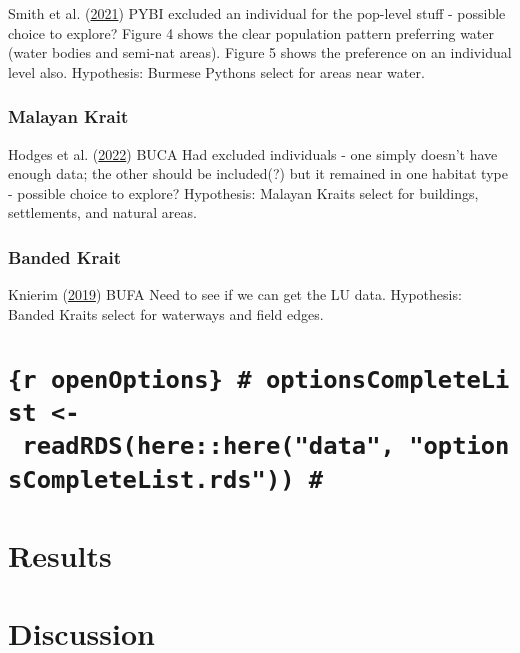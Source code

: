 \documentclass[10pt,a4paper]{article}
\begin{document}
Smith et al. (\protect\hyperlink{ref-smith_native_2021}{2021})
PYBI
excluded an individual for the pop-level stuff - possible choice to explore?
Figure 4 shows the clear population pattern preferring water (water bodies and semi-nat areas). Figure 5 shows the preference on an individual level also.
Hypothesis: Burmese Pythons select for areas near water.

\hypertarget{malayan-krait-1}{%
\subsubsection{Malayan Krait}\label{malayan-krait-1}}

Hodges et al. (\protect\hyperlink{ref-hodges_malayan_2022}{2022})
BUCA
Had excluded individuals - one simply doesn't have enough data; the other should be included(?) but it remained in one habitat type - possible choice to explore?
Hypothesis: Malayan Kraits select for buildings, settlements, and natural areas.

\hypertarget{banded-krait-1}{%
\subsubsection{Banded Krait}\label{banded-krait-1}}

Knierim (\protect\hyperlink{ref-knierim_spatial_2019}{2019})
BUFA
Need to see if we can get the LU data.
Hypothesis: Banded Kraits select for waterways and field edges.

\hypertarget{r-openoptions-optionscompletelist---readrdshereheredata-optionscompletelist.rds}{%
\section{\texorpdfstring{\texttt{\{r\ openOptions\}\ \#\ optionsCompleteList\ \textless{}-\ readRDS(here::here("data",\ "optionsCompleteList.rds"))\ \#}}{\{r openOptions\} \# optionsCompleteList \textless- readRDS(here::here("data", "optionsCompleteList.rds")) \#}}\label{r-openoptions-optionscompletelist---readrdshereheredata-optionscompletelist.rds}}

\hypertarget{results}{%
\section{Results}\label{results}}

\hypertarget{discussion}{%
\section{Discussion}\label{discussion}}
\end{document}
